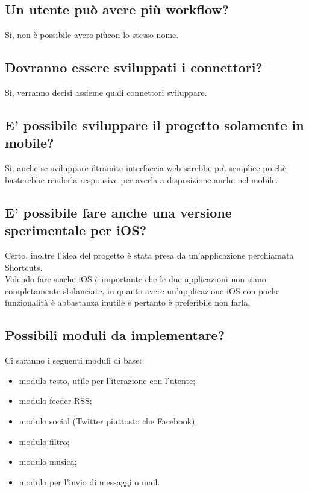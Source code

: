 \documentclass[a4paper,12pt]{article}
\begin{document}
	\subsection{Un utente può avere più workflow?}
	Sì, non è possibile avere piùcon lo stesso nome.
	
	\subsection{Dovranno essere sviluppati i connettori?}
	Sì, verranno decisi assieme quali connettori sviluppare.
	
	\subsection{E' possibile sviluppare il progetto solamente in mobile?}
	Sì, anche se sviluppare iltramite interfaccia web sarebbe  più semplice poichè basterebbe renderla responsive per averla a disposizione anche nel mobile.
	
	\subsection{E' possibile fare anche una versione sperimentale per iOS?}
	Certo, inoltre l'idea del progetto è stata presa da un'applicazione perchiamata Shortcuts. \\
	Volendo fare siache iOS è importante che le due applicazioni non siano completamente sbilanciate, in quanto avere un'applicazione iOS con poche funzionalità è abbastanza inutile e pertanto è preferibile non farla.
	
	\subsection{Possibili moduli da implementare?}
	Ci saranno i seguenti moduli di base:
	\begin{itemize}
		\item modulo testo, utile per l'iterazione con l'utente;
		\item modulo feeder RSS;
		\item modulo social (Twitter piuttosto che Facebook);
		\item modulo filtro;
		\item modulo musica;
		\item modulo per l'invio di messaggi o mail.
	\end{itemize}
\end{document}
